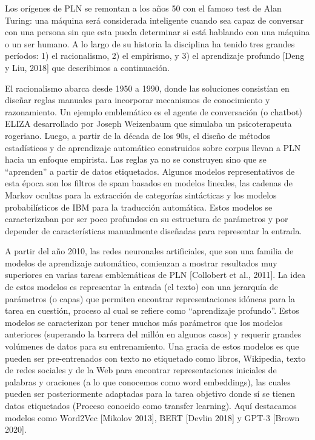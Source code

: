 Los orígenes de PLN se remontan a los años 50 con el famoso test de Alan Turing: una máquina será considerada inteligente cuando sea capaz de conversar con una persona sin que esta pueda determinar si está hablando con una máquina o un ser humano. A lo largo de su historia la disciplina ha tenido tres grandes períodos: 1) el racionalismo, 2) el empirismo, y 3) el aprendizaje profundo [Deng y Liu, 2018] que describimos a continuación.

El racionalismo abarca desde 1950 a 1990, donde las soluciones consistían en diseñar reglas manuales para incorporar mecanismos de conocimiento y razonamiento. Un ejemplo emblemático es el agente de conversación (o chatbot) ELIZA desarrollado por Joseph Weizenbaum que simulaba  un psicoterapeuta rogeriano. Luego, a partir de la década de los 90s, el diseño de métodos estadísticos y de aprendizaje automático construidos sobre corpus llevan a PLN hacia un enfoque empirista. Las reglas ya no se construyen sino que se “aprenden” a partir de datos etiquetados.  Algunos modelos representativos de esta época son los filtros de spam basados en modelos lineales, las cadenas de Markov ocultas para la extracción de categorías sintácticas y los modelos probabilísticos de IBM para la traducción automática. Estos modelos se caracterizaban por ser poco profundos en su estructura de parámetros y por depender de características manualmente diseñadas para representar la entrada.

A partir del año 2010, las redes neuronales artificiales, que son una familia de modelos de aprendizaje automático, comienzan a mostrar resultados muy superiores en varias tareas emblemáticas de PLN [Collobert et al., 2011]. La idea de estos modelos es representar la entrada (el texto) con una jerarquía de parámetros (o capas) que permiten encontrar representaciones idóneas para la tarea en cuestión, proceso al cual se refiere como “aprendizaje profundo”. Estos modelos se caracterizan por tener muchos más parámetros que los modelos anteriores (superando la barrera del millón en algunos casos) y requerir grandes volúmenes de datos para su entrenamiento. Una gracia de estos modelos es que pueden ser pre-entrenados con texto no etiquetado como libros, Wikipedia, texto de redes sociales y de la Web para encontrar representaciones iniciales de palabras y oraciones (a lo que conocemos como word embeddings),  las cuales pueden ser posteriormente adaptadas para la tarea objetivo donde sí se tienen datos etiquetados (Proceso conocido como transfer learning). Aquí destacamos modelos como Word2Vec [Mikolov 2013], BERT  [Devlin 2018] y GPT-3  [Brown 2020].

